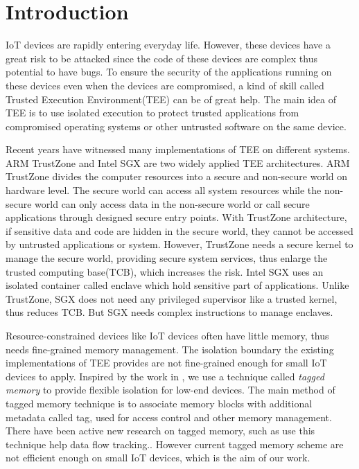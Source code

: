 \documentclass[conference]{IEEEtran}
\begin{document}
\section{Introduction}
IoT devices are rapidly entering everyday life. However, these devices have a great risk to be attacked since the code of these devices are complex thus potential to have bugs. To ensure the security of the applications running on these devices even when the devices are compromised, a kind of skill called Trusted Execution Environment(TEE) can be of great help. The main idea of TEE is to use isolated execution to protect trusted applications from compromised operating systems or other untrusted software on the same device.

Recent years have witnessed many implementations of TEE on different systems. ARM TrustZone and Intel SGX are two widely applied TEE architectures. ARM TrustZone divides the computer resources into a secure and non-secure world on hardware level.\cite{TrustZone} The secure world can access all system resources while the non-secure world can only access data in the non-secure world or call secure applications through designed secure entry points. With TrustZone architecture, if sensitive data and code are hidden in the secure world, they cannot be accessed by untrusted applications or system. However, TrustZone needs a secure kernel to manage the secure world, providing secure system services, thus enlarge the trusted computing base(TCB), which increases the risk. Intel SGX uses an isolated container called enclave which hold sensitive part of applications.\cite{SGX} Unlike TrustZone, SGX does not need any privileged supervisor like a trusted kernel, thus reduces TCB. But SGX needs complex instructions to manage enclaves.

Resource-constrained devices like IoT devices often have little memory, thus needs fine-grained memory management. The isolation boundary the existing implementations of TEE provides are not fine-grained enough for small IoT devices to apply.\cite{TIMBERV} Inspired by the work in \cite{TIMBERV}, we use a technique called \emph{tagged memory} to provide flexible isolation for low-end devices. The main method of tagged memory technique is to associate memory blocks with additional metadata called tag, used for access control and other memory management. There have been active new research on tagged memory, such as use this technique help data flow tracking.\cite{HDFI}. However current tagged memory scheme are not efficient enough on small IoT devices\cite{TIMBERV}, which is the aim of our work.
\end{document}
